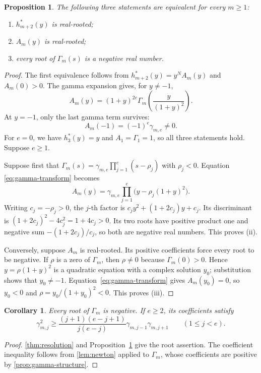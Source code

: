 \documentclass[reqno, 12pt]{article}
\numberwithin{equation}{section}
\newtheorem{proposition}[theorem]{Proposition}
\newtheorem{corollary}[theorem]{Corollary}
\theoremstyle{definition}
\begin{document}
\begin{proposition}\label{prop:root-equivalence}
The following three statements are equivalent for every $m\geq1$:
\begin{enumerate}
\item[(i)] $h_{m+2}^*(y)$ is real-rooted;
\item[(ii)] $A_m(y)$ is real-rooted;
\item[(iii)] every root of $\Gamma_m(s)$ is a negative real number.
\end{enumerate}
\end{proposition}
\begin{proof}
The first equivalence follows from $h_{m+2}^*(y)=y^NA_m(y)$ and
$A_m(0)>0$.  The gamma expansion gives, for $y\neq-1$,
\begin{equation}\label{eq:gamma-transform}
A_m(y)=(1+y)^{2e}\Gamma_m\left(\frac{y}{(1+y)^2}\right).
\end{equation}
At $y=-1$, only the last gamma term survives:
\begin{equation}\label{eq:minus-one}
A_m(-1)=(-1)^e\gamma_{m,e}\neq0.
\end{equation}
For $e=0$, we have $h_3^*(y)=y$ and $A_1=\Gamma_1=1$,
so all three statements hold.  Suppose $e\geq1$.

Suppose first that
$\Gamma_m(s)=\gamma_{m,e}\prod_{j=1}^e(s-\rho_j)$ with
$\rho_j<0$.  Equation \eqref{eq:gamma-transform} becomes
\[
A_m(y)=\gamma_{m,e}\prod_{j=1}^e
\bigl(y-\rho_j(1+y)^2\bigr).
\]
Writing $c_j=-\rho_j>0$, the $j$-th factor is
$c_jy^2+(1+2c_j)y+c_j$.  Its discriminant is
$(1+2c_j)^2-4c_j^2=1+4c_j>0$.
Its two roots have positive product one and negative sum
$-(1+2c_j)/c_j$, so both are negative real numbers.
This proves \textup{(ii)}.

Conversely, suppose $A_m$ is real-rooted.  Its positive
coefficients force every root to be negative.  If $\rho$ is a
zero of $\Gamma_m$, then $\rho\neq0$ because
$\Gamma_m(0)>0$.  Hence $y=\rho(1+y)^2$ is a quadratic
equation with a complex solution $y_0$; substitution shows that
$y_0\neq-1$.  Equation~\eqref{eq:gamma-transform} gives
$A_m(y_0)=0$, so $y_0<0$ and
$\rho=y_0/(1+y_0)^2<0$.  This proves \textup{(iii)}.
\end{proof}

\begin{corollary}\label{cor:gamma-roots}
Every root of $\Gamma_m$ is negative.  If $e\geq2$, its coefficients satisfy
\[
\gamma_{m,j}^2\geq
\frac{(j+1)(e-j+1)}{j(e-j)}
\gamma_{m,j-1}\gamma_{m,j+1}\qquad(1\leq j<e).
\]
\end{corollary}
\begin{proof}
\cref{thm:resolution} and
Proposition~\ref{prop:root-equivalence} give the root assertion.
The coefficient inequality follows from \cref{lem:newton}
applied to $\Gamma_m$, whose coefficients are positive by \cref{prop:gamma-structure}.
\end{proof}
\end{document}
